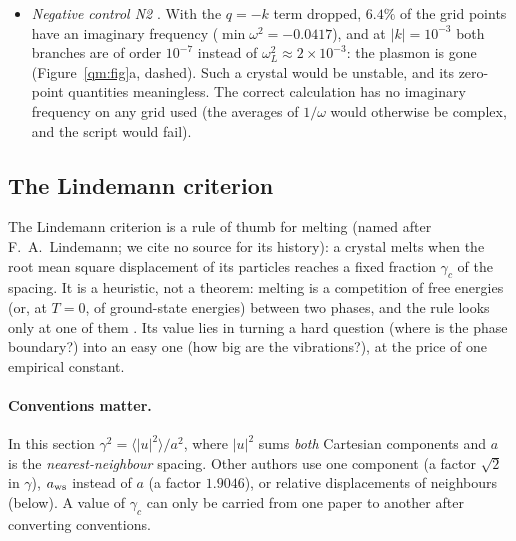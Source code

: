 \begin{itemize}
$1/(2c_T^2)=3.61630$ predicted by Proposition~\ref{qm:prop-finite} (in reduced units $n=1/\pi$, and $\ln N=2\ln m$).
The quantum averages in the same table converge; the classical one does not, and it fails in exactly the predicted
way.
\item \emph{Negative control N2} \tierX. With the $q=-k$ term dropped, $6.4\%$ of the grid points have an imaginary
frequency ($\min\omega^2=-0.0417$), and at $|k|=10^{-3}$ both branches are of order $10^{-7}$ instead of
$\omega_L^2\approx2\times10^{-3}$: the plasmon is gone (Figure~\ref{qm:fig}a, dashed). Such a crystal would be
unstable, and its zero-point quantities meaningless. The correct calculation has no imaginary frequency on any grid
used (the averages of $1/\omega$ would otherwise be complex, and the script would fail).
\end{itemize}

\subsection{The Lindemann criterion}\label{qm:sec-lindemann}

The Lindemann criterion is a rule of thumb for melting (named after F.~A.~Lindemann; we cite no source for its
history): a crystal melts when the root mean square displacement of its
particles reaches a fixed fraction $\gamma_c$ of the spacing. It is a heuristic, not a theorem: melting is a
competition of free energies (or, at $T=0$, of ground-state energies) between two phases, and the rule looks only at
one of them \tierC. Its value lies in turning a hard question (where is the phase boundary?) into an easy one (how big
are the vibrations?), at the price of one empirical constant.

\paragraph{Conventions matter.} In this section $\gamma^2=\langle|u|^2\rangle/a^2$, where $|u|^2$ sums \emph{both}
Cartesian components and $a$ is the \emph{nearest-neighbour} spacing. Other authors use one component (a factor
$\sqrt2$ in $\gamma$), $a_{\rm ws}$ instead of $a$ (a factor $1.9046$), or relative displacements of neighbours
(below). A value of $\gamma_c$ can only be carried from one paper to another after converting conventions.

